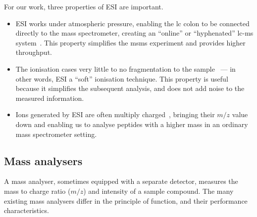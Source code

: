 For our work, three properties of ESI are important.

\begin{itemize}
  \item ESI works under atmospheric pressure, enabling the \gls*{lc} colon to be connected directly to the mass spectrometer, creating an ``online'' or ``hyphenated'' \gls*{lc}-\gls*{ms} system~\cite{opiteck1997comprehensive}. This property simplifies the \gls*{msms} experiment and provides higher throughput.
  \item The ionisation cases very little to no fragmentation to the sample~\cite{griffiths2001electrospray} --- in other words, ESI a ``soft'' ionisation technique. This property is useful because it simplifies the subsequent analysis, and does not add noise to the measured information.
  \item  Ions generated by ESI are often multiply charged~\cite{felitsyn2002origin}, bringing their \(m/z\) value down and enabling us to analyse peptides with a higher mass in an ordinary mass spectrometer setting.
\end{itemize}

\subsection{Mass analysers}\label{sec:msms-analysis}

A mass analyser, sometimes equipped with a separate detector, measures the mass to charge ratio (\(m/z\)) and intensity of a sample compound. The many existing mass analysers differ in the principle of function, and their performance characteristics.

